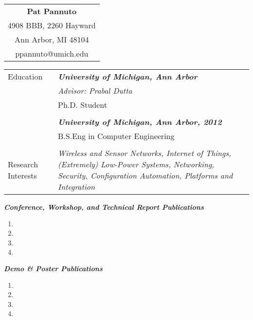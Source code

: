 \documentclass{article}
\begin{document}

\begin{table}
\centering
\begin{tabular}{c}
{\bf Pat Pannuto} \\
4908 BBB, 2260 Hayward \\
Ann Arbor, MI 48104 \\
ppannuto@umich.edu \\
\end{tabular}
\end{table}


\begin{table}
\begin{tabularx}{\linewidth}{p{2cm} X}
{\sc Education} & {\bf {\em University of Michigan, Ann Arbor}} \\
 & {\em Advisor: Prabal Dutta} \\
 & Ph.D. Student \\
 & \\
 & {\bf {\em University of Michigan, Ann Arbor, 2012}} \\
 & B.S.Eng in Computer Engineering \\
 & \\
{\sc Research Interests} & {\em Wireless and Sensor Networks, Internet of
Things, (Extremely) Low-Power Systems, Networking, Security, Configuration
Automation, Platforms and Integration}
\end{tabularx}
\end{table}

{\bf {\em Conference, Workshop, and Technical Report Publications}}

\begin{enumerate}

  \item {}
  \item {}
  \item {}
  \item {}

\end{enumerate}

{\bf {\em Demo \& Poster Publications}}
\begin{enumerate}

  \item {}
  \item {}
  \item {}
  \item {}

\end{enumerate}
\end{document}
